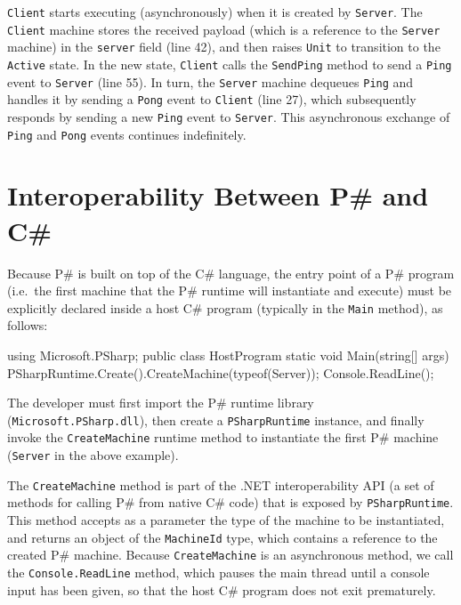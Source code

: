 \documentclass{llncs}
\newcommand{\ps}{P\#\xspace}
\newcommand{\cs}{C\#\xspace}
\begin{document}
\texttt{Client} starts executing (asynchronously) when it is created by \texttt{Server}. The \texttt{Client} machine stores the received payload (which is a reference to the \texttt{Server} machine) in the \texttt{server} field (line 42), and then raises \texttt{Unit} to transition to the \texttt{Active} state. In the new state, \texttt{Client} calls the \texttt{SendPing} method to send a \texttt{Ping} event to \texttt{Server} (line 55). In turn, the \texttt{Server} machine dequeues \texttt{Ping} and handles it by sending a \texttt{Pong} event to \texttt{Client} (line 27), which subsequently responds by sending a new \texttt{Ping} event to \texttt{Server}. This asynchronous exchange of \texttt{Ping} and \texttt{Pong} events continues indefinitely.

\section{Interoperability Between \ps and \cs}
\label{sec:interop}

Because \ps is built on top of the \cs language, the entry point of a \ps program (i.e.\ the first machine that the \ps runtime will instantiate and execute) must be explicitly declared inside a host \cs program (typically in the \texttt{Main} method), as follows:

\begin{psharpNoLines}
using Microsoft.PSharp;
public class HostProgram {
  static void Main(string[] args) {
    PSharpRuntime.Create().CreateMachine(typeof(Server));
    Console.ReadLine();
  }
}
\end{psharpNoLines}

\noindent
The developer must first import the \ps runtime library (\texttt{Microsoft.PSharp.dll}), then create a \texttt{PSharpRuntime} instance, and finally invoke the \texttt{CreateMachine} runtime method to instantiate the first \ps machine (\texttt{Server} in the above example).

The \texttt{CreateMachine} method is part of the .NET interoperability API (a set of methods for calling \ps from native \cs code) that is exposed by \texttt{PSharpRuntime}. This method accepts as a parameter the type of the machine to be instantiated, and returns an object of the \texttt{MachineId} type, which contains a reference to the created \ps machine. Because \texttt{CreateMachine} is an asynchronous method, we call the \texttt{Console.ReadLine} method, which pauses the main thread until a console input has been given, so that the host \cs program does not exit prematurely.
\end{document}
